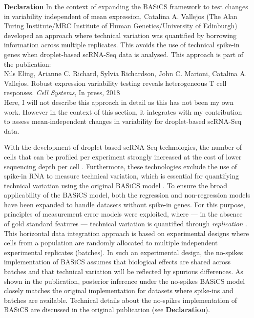 \begin{Comment}
\hspace{-3mm} \textbf{Declaration} In the context of expanding the BASiCS framework to test changes in variability independent of mean expression, Catalina A. Vallejos (The Alan Turing Institute/MRC Institute of Human Genetics/University of Edinburgh) developed an approach where technical variation was quantified by borrowing information across multiple replicates. This avoids the use of technical spike-in genes when droplet-based scRNA-Seq data is analysed. This approach is part of the publication:\\

Nils Eling, Arianne C. Richard, Sylvia Richardson, John C. Marioni, Catalina A. Vallejos. Robust expression variability testing reveals heterogeneous T cell responses. \emph{Cell Systems}, In press, 2018 \\

Here, I will not describe this approach in detail as this has not been my own work. However in the context of this section, it integrates with my contribution to assess mean-independent changes in variability for droplet-based scRNA-Seq data.
\end{Comment}

With the development of droplet-based scRNA-Seq technologies, the number of cells that can be profiled per experiment strongly increased at the cost of lower sequencing depth per cell \citep{Macosko2015, Klein2015, Zheng2017}. Furthermore, these technologies exclude the use of spike-in RNA to measure technical variation, which is essential for quantifying technical variation using the original BASiCS model \citep{Vallejos2015BASiCS, Vallejos2016}. To ensure the broad applicability of the BASiCS model, both the regression and non-regression models have been expanded to handle datasets without spike-in genes. For this purpose, principles of measurement error models were exploited, where --- in the absence of gold standard features --- technical variation is quantified through {\it replication} \citep{Carroll1998}. This horizontal data integration approach is based on experimental designs where cells from a population are randomly allocated to multiple independent experimental replicates (batches). In such an experimental design, the no-spikes implementation of BASiCS assumes that biological effects are shared across batches and that technical variation will be reflected by spurious differences. As shown in the publication, posterior inference under the no-spikes BASiCS model closely matches the original implementation for datasets where spike-ins and batches are available. Technical details about the no-spikes implementation of BASiCS are discussed in the original publication (see \textbf{Declaration}).

